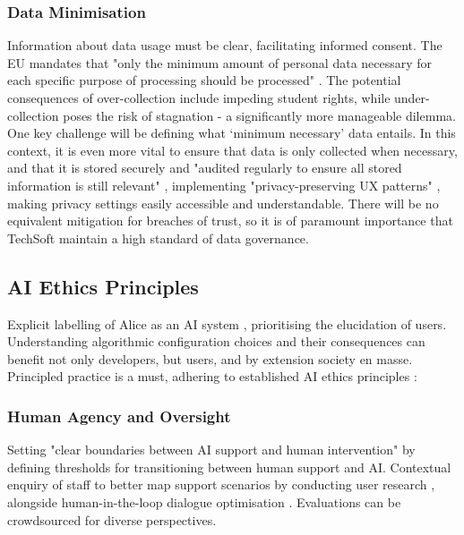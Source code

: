 \documentclass[14pt,a4paper]{article}
\begin{document}
\begin{multicols}{2}
\subsubsection{Data Minimisation}
Information about data usage must be clear, facilitating informed consent.
The EU mandates that "only the minimum amount of personal data necessary for each specific purpose of processing should be processed" \textit{\parencite{EU2016}}.
The potential consequences of over-collection include impeding student rights, while under-collection poses the risk of stagnation - a significantly more manageable dilemma.
One key challenge will be defining what `minimum necessary' data entails.
In this context, it is even more vital to ensure that data is only collected when necessary, and that it is stored securely and "audited regularly to ensure all stored information is still relevant" \textit{\parencite{A29WP2018}}, implementing "privacy-preserving UX patterns" \textit{\parencite[pp. 50-100]{Hartzog2024}}, making privacy settings easily accessible and understandable.
There will be no equivalent mitigation for breaches of trust, so it is of paramount importance that TechSoft maintain a high standard of data governance.

\subsection{AI Ethics Principles}
Explicit labelling of Alice as an AI system \textit{\parencite{IEEE2024}}, prioritising the elucidation of users.
Understanding algorithmic configuration choices and their consequences can benefit not only developers, but users, and by extension society en masse.
Principled practice is a must, adhering to established AI ethics principles \textit{\parencite{EC2024}}:

\subsubsection{Human Agency and Oversight}

Setting "clear boundaries between AI support and human intervention" \textit{\parencite{APA2024}} by defining thresholds for transitioning between human support and AI.
Contextual enquiry of staff to better map support scenarios by conducting user research \textit{\parencite[pp. 50-100]{Goodman2024}}, alongside human-in-the-loop dialogue optimisation \textit{\parencite[pp. 30-60]{Vaughan2024}}.
Evaluations can be crowdsourced for diverse perspectives.


\end{multicols}
\end{document}
